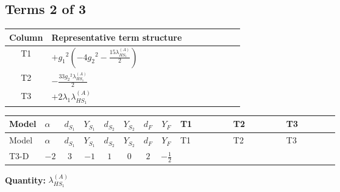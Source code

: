 \documentclass[8pt]{article}
\begin{document}
\begin{landscape}
\subsection*{Terms 2 of 3}
\begin{center}
\begin{tabular}{@{}c >{\raggedright\arraybackslash}p{0.82\linewidth}@{}}
\toprule
Column & Representative term structure \\
\midrule
T1 & \(\displaystyle +{g_1}^2 \left(-4 {g_2}^2-\frac{15 {\lambda_{HS_1}^{(A)}}}{2}\right)\) \\
\midrule
T2 & \(\displaystyle -\frac{33 {g_2}^2 {\lambda_{HS_1}^{(A)}}}{2}\) \\
\midrule
T3 & \(\displaystyle +2 {\lambda_1} {\lambda_{HS_1}^{(A)}}\) \\
\midrule
\bottomrule
\end{tabular}
\end{center}
\smallskip
\tiny
\begin{longtable}{@{}llcccccc >{\raggedright\arraybackslash}p{0.21\linewidth} >{\raggedright\arraybackslash}p{0.21\linewidth} >{\raggedright\arraybackslash}p{0.21\linewidth}@{}}
\toprule
Model & $\alpha$ & $d_{S_1}$ & $Y_{S_1}$ & $d_{S_2}$ & $Y_{S_2}$ & $d_F$ & $Y_F$ & T1 & T2 & T3 \\
\midrule
\endfirsthead
\toprule
Model & $\alpha$ & $d_{S_1}$ & $Y_{S_1}$ & $d_{S_2}$ & $Y_{S_2}$ & $d_F$ & $Y_F$ & T1 & T2 & T3 \\
\midrule
\endhead
T3-D & $-2$ & $3$ & $-1$ & $1$ & $0$ & $2$ & $-\frac{1}{2}$ & \scriptsize\adjustbox{max width=\linewidth}{$\begin{gathered} +{g_1}^2 \left(-4 {g_2}^2-\frac{15 {\lambda_{HS_1}^{(A)}}}{2}\right)\end{gathered}$} & \scriptsize\adjustbox{max width=\linewidth}{$\begin{gathered} -\frac{33 {g_2}^2 {\lambda_{HS_1}^{(A)}}}{2}\end{gathered}$} & \scriptsize\adjustbox{max width=\linewidth}{$\begin{gathered} +2 {\lambda_1} {\lambda_{HS_1}^{(A)}}\end{gathered}$} \\
\midrule
\bottomrule
\end{longtable}
\clearpage
\noindent\textbf{Quantity: }$\lambda_{HS_1}^{(A)}$\par\smallskip

\end{landscape}
\end{document}
